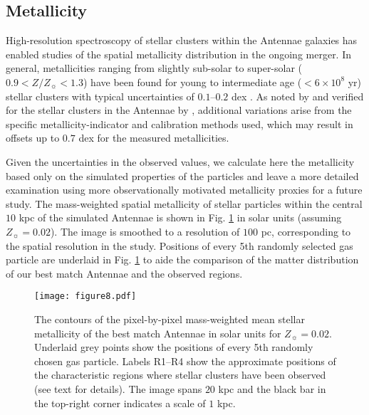 \documentclass[a4paper,fleqn,usenatbib]{mnras}
\begin{document}
\subsection{Metallicity}\label{section:antennae_metallicity}

High-resolution spectroscopy of stellar clusters within the Antennae galaxies 
has enabled studies of the spatial metallicity distribution in the ongoing merger. In general, metallicities ranging from slightly 
sub-solar to super-solar ($0.9<Z/Z_{{\sun}}<1.3$) have been found for young to intermediate age ($ < 6\times 10^8$ yr)
stellar clusters with typical uncertainties of $0.1$--$0.2$ dex \citep{2009ApJ...701..607B, 2015ApJ...812..160L}. 
As noted by \citet{2008ApJ...681.1183K} and verified for the stellar clusters in the Antennae by
\citet{2015ApJ...812..160L}, additional variations arise from the specific metallicity-indicator and 
calibration methods used, which may result in offsets up to $0.7$ dex for the measured metallicities. 

Given the uncertainties in the observed values, we calculate here the metallicity based only on the
simulated properties of the particles and leave a more detailed examination 
using more observationally motivated metallicity proxies for a future study. The mass-weighted
spatial metallicity of stellar particles within the central $10$ kpc of the simulated Antennae is shown in Fig.
\ref{fig:Antennae_spatial_metals} in solar units (assuming $Z_{\sun}=0.02$). The image is smoothed to a resolution of $100$ pc,
corresponding to the spatial resolution in the \citet{2009ApJ...701..607B} study.
Positions of every 5th randomly selected gas particle are underlaid in Fig. \ref{fig:Antennae_spatial_metals}
to aide the comparison of the matter distribution of our best match Antennae and the observed regions.

\begin{figure}\texttt{[image: figure8.pdf]}
\caption{The contours of the pixel-by-pixel mass-weighted mean stellar metallicity of the best match Antennae
in solar units for $Z_{\sun}=0.02$. Underlaid grey points show the positions of every 5th randomly chosen
gas particle. Labels R1--R4 show the approximate positions of the
characteristic regions where stellar clusters have been observed (see text for details).
The image spans $20$ kpc and the black bar in the top-right corner indicates a scale of $1$ kpc.}
\label{fig:Antennae_spatial_metals}
\end{figure}
\end{document}
